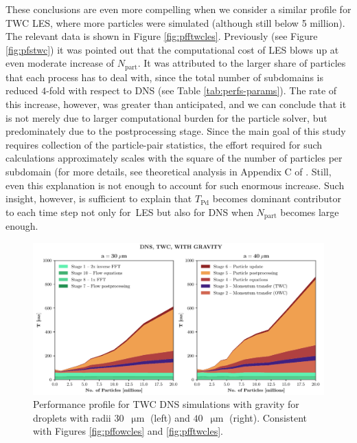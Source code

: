 \documentclass{pracamgren}
\begin{document}
These conclusions are even more compelling when we consider a similar profile for TWC LES, where more particles were simulated (although still below 5 million).
The relevant data is shown in Figure \ref{fig:pfftwcles}.
Previously (see Figure \ref{fig:pfstwc}) it was pointed out that the computational cost of LES blows up at even moderate increase of $N_{\text{part}}$.
It was attributed to the larger share of particles that each process has to deal with, since the total number of subdomains is reduced $4$-fold with respect to DNS (see Table \ref{tab:perfs-params}).
The rate of this increase, however, was greater than anticipated, and we can conclude that it is not merely due to larger computational burden for the particle solver, but predominately due to the postprocessing stage.
Since the main goal of this study requires collection of the particle-pair statistics, the effort required for such calculations approximately scales with the square of the number of particles per subdomain (for more details, see theoretical analysis in Appendix C of \textcite{Ayala2014}.
Still, even this explanation is not enough to account for such enormous increase.
Such insight, however, is sufficient to explain that $T_{\text{Pd}}$ becomes dominant contributor to each time step not only for~LES but also for DNS when $N_{\text{part}}$ becomes large enough.

\begin{figure}[h]
\centering
\includegraphics[width=13.5cm]{img/plots/3-3d-pfftwcdns.pdf}
\caption{
Performance profile for TWC DNS simulations with gravity for droplets with radii $30$~$\upmu\text{m}$ (left) and $40$~$\upmu\text{m}$ (right).
Consistent with Figures \ref{fig:pffowcles} and \ref{fig:pfftwcles}.
}
\label{fig:pfftwcdns}
\end{figure}
\end{document}
